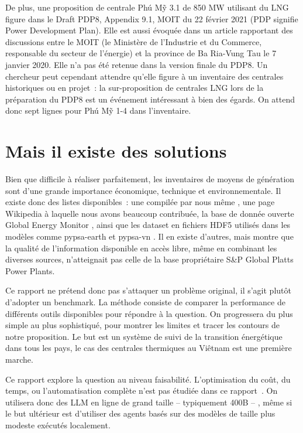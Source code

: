 \documentclass[a4paper,11pt]{report}
\begin{document}
De plus, une proposition de centrale Phú Mỹ 3.1 de 850 MW utilisant du LNG figure dans le Draft PDP8, Appendix 9.1, MOIT du 22 février 2021 (PDP signifie Power Development Plan). Elle est aussi évoquée dans un article rapportant des discussions entre le MOIT (le Ministère de l'Industrie et du Commerce, responsable du secteur de l'énergie) et la province de Ba Ria-Vung Tau le 7 janvier 2020. Elle n'a pas été retenue dans la version finale du PDP8. Un chercheur peut cependant attendre qu'elle figure à un inventaire des centrales historiques ou en projet~: la sur-proposition de centrales LNG lors de la préparation du PDP8 est un événement intéressant à bien des égards. On attend donc sept lignes pour Phú Mỹ 1-4 dans l'inventaire.

\section{Mais il existe des solutions}

Bien que difficile à réaliser parfaitement, les inventaires de moyens de génération sont d'une grande importance économique, technique et environnementale. Il existe donc des listes disponibles~: une compilée par nous même \citep{NLN8GPNI}, une page Wikipedia \citep{TQ8TFB8H} à laquelle nous avons beaucoup contribuée, la base de donnée ouverte Global Energy Monitor \citep{LCVI7NAT}, ainsi que les dataset en fichiers HDF5 utilisés dans les modèles comme pypsa-earth \citep{UMGUESAZ} et pypsa-vn \citep{VGASHFPT}. Il en existe d'autres, mais \citep{LYGDCQCL} montre que la qualité de l'information disponible en accès libre, même en combinant les diverses sources, n'atteignait pas celle de la base propriétaire S\&P Global Platts Power Plants.

Ce rapport ne prétend donc pas s'attaquer un problème original, il s'agit plutôt d'adopter un benchmark. La méthode consiste de comparer la performance de différents outils disponibles pour répondre à la question. On progressera du plus simple au plus sophistiqué, pour montrer les limites et tracer les contours de notre proposition. Le but est un système de suivi de la transition énergétique dans tous les pays, le cas des centrales thermiques au Viêtnam est une première marche.

Ce rapport explore la question au niveau faisabilité. L'optimisation du coût, du temps, ou l'automatisation complète n'est pas étudiée dans ce rapport~. On utilisera donc des LLM en ligne de grand taille -- typiquement 400B -- , même si le but ultérieur est d'utiliser des agents basés sur des modèles de taille plus modeste exécutés localement.
\end{document}
